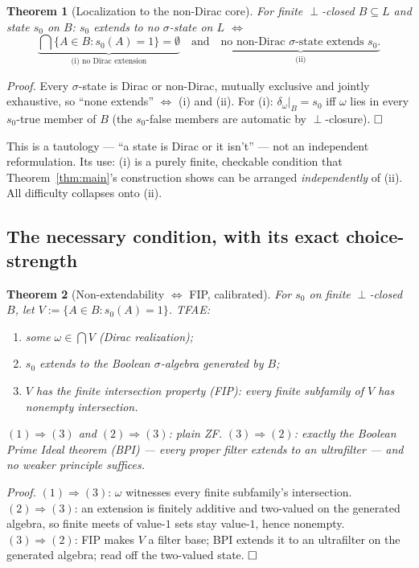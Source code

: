 \documentclass[11pt]{article}
\newtheorem{theorem}{Theorem}[section]
\theoremstyle{remark}
\begin{document}
\begin{theorem}[Localization to the non-Dirac core]
\label{thm:localization}
For finite $\perp$-closed $B\subseteq L$ and state $s_0$ on $B$: $s_0$
extends to no $\sigma$-state on $L$ $\iff$
\[
  \underbrace{\bigcap\{A\in B : s_0(A)=1\} = \emptyset}_{\text{(i) no Dirac
  extension}} \quad\text{and}\quad \underbrace{\text{no non-Dirac
  $\sigma$-state extends $s_0$.}}_{\text{(ii)}}
\]
\end{theorem}

\emph{Proof.} Every $\sigma$-state is Dirac or non-Dirac, mutually exclusive
and jointly exhaustive, so ``none extends'' $\iff$ (i) and (ii). For (i):
$\delta_\omega|_B = s_0$ iff $\omega$ lies in every $s_0$-true member of $B$
(the $s_0$-false members are automatic by $\perp$-closure). $\hfill\square$

This is a tautology — ``a state is Dirac or it isn't'' — not an independent
reformulation. Its use: (i) is a purely finite, checkable condition that
Theorem~\ref{thm:main}'s construction shows can be arranged \emph{independently}
of (ii). All difficulty collapses onto (ii).

\subsection{The necessary condition, with its exact choice-strength}

\begin{theorem}[Non-extendability $\Leftrightarrow$ FIP, calibrated]
\label{thm:nonextend}
For $s_0$ on finite $\perp$-closed $B$, let $V := \{A\in B : s_0(A)=1\}$.
TFAE:
\begin{enumerate}[label=(\arabic*)]
\item some $\omega\in\bigcap V$ (Dirac realization);
\item $s_0$ extends to the Boolean $\sigma$-algebra generated by $B$;
\item $V$ has the \emph{finite intersection property} (FIP): every finite
  subfamily of $V$ has nonempty intersection.
\end{enumerate}
$(1)\Rightarrow(3)$ and $(2)\Rightarrow(3)$: plain ZF. $(3)\Rightarrow(2)$:
exactly the Boolean Prime Ideal theorem (BPI) — every proper filter extends
to an ultrafilter — and no weaker principle suffices.
\end{theorem}

\emph{Proof.} $(1)\Rightarrow(3)$: $\omega$ witnesses every finite
subfamily's intersection. $(2)\Rightarrow(3)$: an extension is finitely
additive and two-valued on the generated algebra, so finite meets of
value-$1$ sets stay value-$1$, hence nonempty. $(3)\Rightarrow(2)$: FIP makes
$V$ a filter base; BPI extends it to an ultrafilter on the generated algebra;
read off the two-valued state. $\hfill\square$
\end{document}
